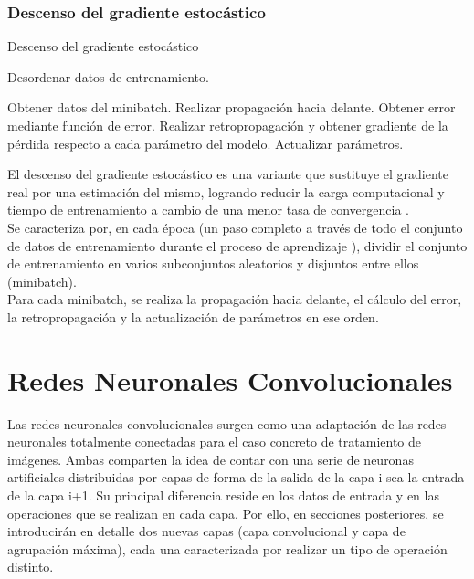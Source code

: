 \subsubsection{Descenso del gradiente estocástico}

\begin{algorithm}[H]
	\caption{Descenso del gradiente estocástico \cite{SGD_3}} 
	\begin{algorithmic}
			\State Desordenar datos de entrenamiento.
			
				\State Obtener datos del minibatch.
				\State Realizar propagación hacia delante.
				\State Obtener error mediante función de error.
				\State Realizar retropropagación y obtener gradiente de la pérdida   
				\State       respecto a cada parámetro del modelo.
				\State Actualizar parámetros.
			\EndFor
		\EndFor
	\end{algorithmic}
\end{algorithm}

El descenso del gradiente estocástico es una variante que sustituye el gradiente real por una estimación del mismo, logrando reducir la carga computacional y tiempo de entrenamiento a cambio de una menor tasa de convergencia \cite{sgd_stocastico} \cite{sgd_stocastico_1}. \\
Se caracteriza por, en cada época (un paso completo a través de todo el conjunto de datos de entrenamiento durante el proceso de aprendizaje \cite{sgd_stocastico}), dividir el conjunto de entrenamiento en varios subconjuntos aleatorios y disjuntos entre ellos (minibatch). \\
Para cada minibatch, se realiza la propagación hacia delante, el cálculo del error, la retropropagación y la actualización de parámetros en ese orden. \\

\section{Redes Neuronales Convolucionales}

Las redes neuronales convolucionales \cite{CNN_definicion} surgen como una adaptación de las redes neuronales totalmente conectadas para el caso concreto de tratamiento de imágenes. Ambas comparten la idea de contar con una serie de neuronas artificiales distribuidas por capas de forma de la salida de la capa i sea la entrada de la capa i+1. Su principal diferencia reside en los datos de entrada y en las operaciones que se realizan en cada capa. Por ello, en secciones posteriores, se introducirán en detalle dos nuevas capas (capa convolucional y capa de agrupación máxima), cada una caracterizada por realizar un tipo de operación distinto.

